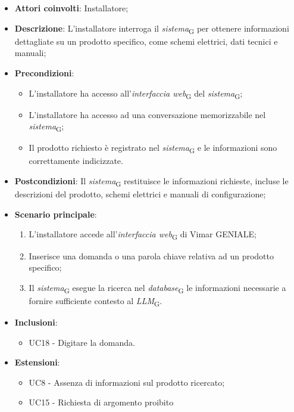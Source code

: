 \begin{itemize}
    \item \textbf{Attori coinvolti}: Installatore;
    \item \textbf{Descrizione}: L’installatore interroga il \textit{sistema}\textsubscript{G} per ottenere informazioni dettagliate su un prodotto specifico, come schemi elettrici, dati tecnici e manuali;
    \item \textbf{Precondizioni}: 
        \begin{itemize}
            \item L’installatore ha accesso all’\textit{interfaccia web}\textsubscript{G} del \textit{sistema}\textsubscript{G};
            \item L’installatore ha accesso ad una conversazione memorizzabile nel \textit{sistema}\textsubscript{G};
            \item Il prodotto richiesto è registrato nel \textit{sistema}\textsubscript{G} e le informazioni sono correttamente indicizzate.
        \end{itemize}
    \item \textbf{Postcondizioni}: Il \textit{sistema}\textsubscript{G} restituisce le informazioni richieste, incluse le descrizioni del prodotto, schemi elettrici e manuali di configurazione;
    \item \textbf{Scenario principale}:
    \begin{enumerate}
    \item L’installatore accede all’\textit{interfaccia web}\textsubscript{G} di Vimar GENIALE;
    \item Inserisce una domanda o una parola chiave relativa ad un prodotto specifico;
    \item Il \textit{sistema}\textsubscript{G} esegue la ricerca nel \textit{database}\textsubscript{G} le informazioni necessarie a fornire sufficiente contesto al \textit{LLM}\textsubscript{G}.
    \end{enumerate}
    \item \textbf{Inclusioni}:
    \begin{itemize}
        \item UC18 - Digitare la domanda.
    \end{itemize}
    \item \textbf{Estensioni}: 
    \begin{itemize}
        \item UC8 - Assenza di informazioni sul prodotto ricercato;
        \item UC15 - Richiesta di argomento proibito
    \end{itemize}

\end{itemize}

